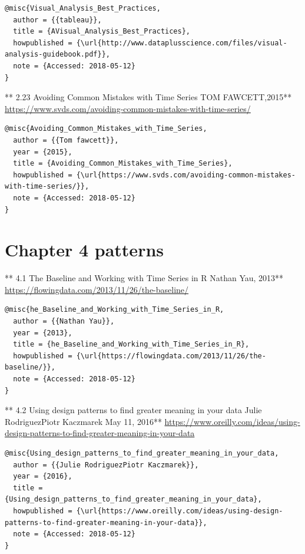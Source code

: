\documentclass[]{book}
\theoremstyle{definition}
\theoremstyle{definition}
\theoremstyle{definition}
\theoremstyle{remark}
\begin{document}
\begin{verbatim}
@misc{Visual_Analysis_Best_Practices,
  author = {{tableau}},
  title = {AVisual_Analysis_Best_Practices},
  howpublished = {\url{http://www.dataplusscience.com/files/visual-analysis-guidebook.pdf}},
  note = {Accessed: 2018-05-12}
}
\end{verbatim}

** 2.23 Avoiding Common Mistakes with Time Series\textbf{ } TOM
FAWCETT,2015**
\url{https://www.svds.com/avoiding-common-mistakes-with-time-series/}
\citep{Avoiding_Common_Mistakes_with_Time_Series}

\begin{verbatim}
@misc{Avoiding_Common_Mistakes_with_Time_Series,
  author = {{Tom fawcett}},
  year = {2015},
  title = {Avoiding_Common_Mistakes_with_Time_Series},
  howpublished = {\url{https://www.svds.com/avoiding-common-mistakes-with-time-series/}},
  note = {Accessed: 2018-05-12}
}
\end{verbatim}

\section{Chapter 4 patterns}\label{chapter-4-patterns}

** 4.1 The Baseline and Working with Time Series in R\textbf{ } Nathan
Yau, 2013** \url{https://flowingdata.com/2013/11/26/the-baseline/}
\citep{The_Baseline_and_Working_with_Time_Series_in_R}

\begin{verbatim}
@misc{he_Baseline_and_Working_with_Time_Series_in_R,
  author = {{Nathan Yau}},
  year = {2013},
  title = {he_Baseline_and_Working_with_Time_Series_in_R},
  howpublished = {\url{https://flowingdata.com/2013/11/26/the-baseline/}},
  note = {Accessed: 2018-05-12}
}
\end{verbatim}

** 4.2 Using design patterns to find greater meaning in your
data\textbf{ }Julie RodriguezPiotr Kaczmarek May 11, 2016**
\url{https://www.oreilly.com/ideas/using-design-patterns-to-find-greater-meaning-in-your-data}
\citep{Using_design_patterns_to_find_greater_meaning_in_your_data}

\begin{verbatim}
@misc{Using_design_patterns_to_find_greater_meaning_in_your_data,
  author = {{Julie RodriguezPiotr Kaczmarek}},
  year = {2016},
  title = {Using_design_patterns_to_find_greater_meaning_in_your_data},
  howpublished = {\url{https://www.oreilly.com/ideas/using-design-patterns-to-find-greater-meaning-in-your-data}},
  note = {Accessed: 2018-05-12}
}
\end{verbatim}
\end{document}
